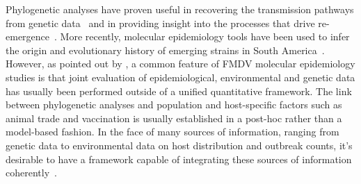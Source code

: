 \documentclass[10pt]{article}
\begin{document}
Phylogenetic analyses have proven useful in recovering the transmission pathways from genetic data~\citep{Cottam2008a, Cottam2008b} and in providing insight into the processes that drive re-emergence~\citep{DiNardo2011}.
More recently, molecular epidemiology tools have been used to infer the origin and evolutionary history of emerging strains in South America~\citep{Perez2001, Malirat2007, Malirat2011, Maradei2013}.
However, as pointed out by \citet{DiNardo2011}, a common feature of FMDV molecular epidemiology studies is that joint evaluation of epidemiological, environmental and genetic data has usually been performed outside of a unified quantitative framework.
The link between phylogenetic analyses and population and host-specific factors such as animal trade and vaccination is usually established in a post-hoc rather than a model-based fashion.
In the face of many sources of information, ranging from genetic data to environmental data on host distribution and outbreak counts, it's desirable to have a framework capable of integrating these sources of information coherently~\citep{Lemey2014, Dudas2017}. %
\end{document}

